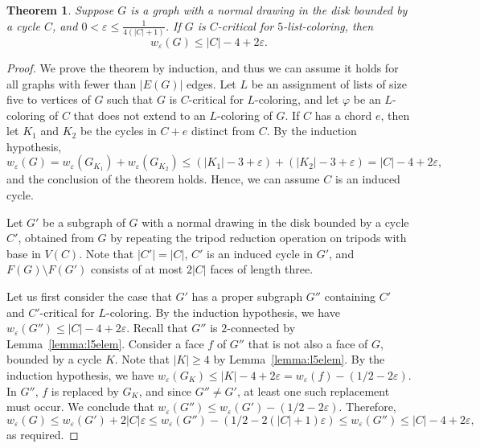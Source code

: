 \documentclass[12pt,twoside,openright,a4paper]{book}
\newtheorem{theorem}{Theorem}[chapter]
\begin{document}
\begin{theorem}\label{thm:l5-quadr}
Suppose $G$ is a graph with a normal drawing in the disk bounded by a cycle $C$,
and $0<\varepsilon\le \tfrac{1}{4(|C|+1)}$.  If $G$ is $C$-critical for $5$-list-coloring, then
$$w_\varepsilon(G)\le |C|-4+2\varepsilon.$$
\end{theorem}
\begin{proof}
We prove the theorem by induction, and thus we can assume it holds for all graphs with fewer than $|E(G)|$ edges.
Let $L$ be an assignment of lists of size five to vertices of $G$ such that $G$ is $C$-critical for $L$-coloring,
and let $\varphi$ be an $L$-coloring of $C$ that does not extend to an $L$-coloring of $G$.
If $C$ has a chord $e$, then let $K_1$ and $K_2$ be the cycles in $C+e$ distinct from $C$.
By the induction hypothesis,
$$w_\varepsilon(G)=w_\varepsilon(G_{K_1})+w_\varepsilon(G_{K_2})\le (|K_1|-3+\varepsilon)+(|K_2|-3+\varepsilon)=|C|-4+2\varepsilon,$$
and the conclusion of the theorem holds.  Hence, we can assume $C$ is an induced cycle.

Let $G'$ be a subgraph of $G$ with a normal drawing in the disk bounded by a cycle $C'$, obtained
from $G$ by repeating the tripod reduction operation on tripods with base in $V(C)$.
Note that $|C'|=|C|$, $C'$ is an induced cycle in $G'$, and $F(G)\setminus F(G')$ consists of at most $2|C|$ faces of length three.

Let us first consider the case that $G'$ has a proper subgraph $G''$ containing $C'$ and $C'$-critical for $L$-coloring.
By the induction hypothesis, we have $w_\varepsilon(G'')\le |C|-4+2\varepsilon$.
Recall that $G''$ is $2$-connected by Lemma~\ref{lemma:l5elem}.
Consider a face $f$ of $G''$ that is not also a face of $G$, bounded by a cycle $K$.  Note that $|K|\ge 4$ by Lemma~\ref{lemma:l5elem}.
By the induction hypothesis, we have $w_\varepsilon(G_K)\le |K|-4+2\varepsilon=w_\varepsilon(f)-(1/2-2\varepsilon)$.
In $G''$, $f$ is replaced by $G_K$, and since $G''\neq G'$, at least one such replacement must occur.  We conclude that
$w_\varepsilon(G'')\le w_\varepsilon(G')-(1/2-2\varepsilon)$.  Therefore,
$$w_\varepsilon(G)\le w_\varepsilon(G')+2|C|\varepsilon\le w_\varepsilon(G'')-(1/2-2(|C|+1)\varepsilon)\le w_\varepsilon(G'')\le |C|-4+2\varepsilon,$$
as required.


\end{proof}
\end{document}
